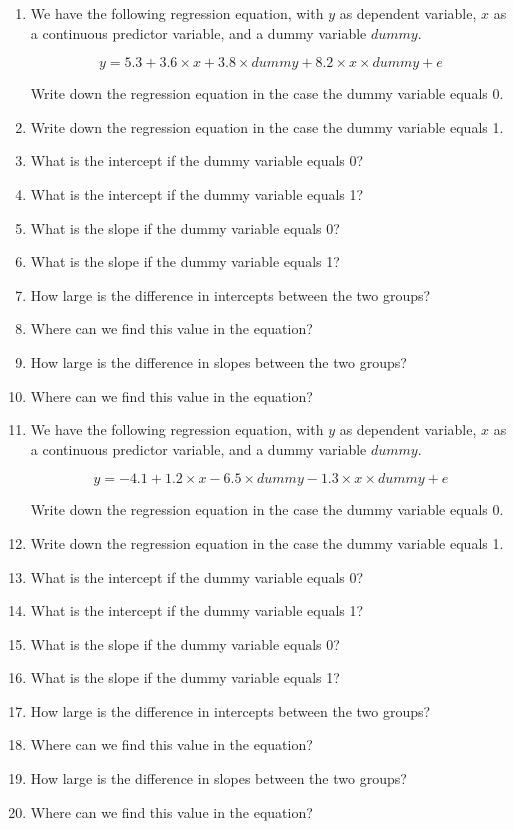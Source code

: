 \begin{enumerate}
\item
We have the following regression equation, with $y$ as dependent variable, $x$ as a continuous predictor variable, and a dummy variable $dummy$.

\begin{equation} 
y = 5.3 + 3.6  \times x + 3.8  \times dummy + 8.2  \times x  \times dummy + e \nonumber
\end{equation}

Write down the regression equation in the case the dummy variable equals 0.
\item Write down the regression equation in the case the dummy variable equals 1.
\item What is the intercept if the dummy variable equals 0?
\item What is the intercept if the dummy variable equals 1?
\item What is the slope if the dummy variable equals 0?
\item What is the slope if the dummy variable equals 1?
\item How large is the difference in intercepts between the two groups?
\item Where can we find this value in the equation?
\item How large is the difference in slopes between the two groups?
\item Where can we find this value in the equation?


\item We have the following regression equation, with $y$ as dependent variable, $x$ as a continuous predictor variable, and a dummy variable $dummy$.

\begin{equation} 
y = - 4.1 + 1.2  \times x - 6.5  \times dummy - 1.3 \times x \times dummy + e \nonumber
\end{equation}

Write down the regression equation in the case the dummy variable equals 0.
\item Write down the regression equation in the case the dummy variable equals 1.
\item What is the intercept if the dummy variable equals 0?
\item What is the intercept if the dummy variable equals 1?
\item What is the slope if the dummy variable equals 0?
\item What is the slope if the dummy variable equals 1?
\item How large is the difference in intercepts between the two groups? 
\item Where can we find this value in the equation?
\item How large is the difference in slopes between the two groups?\
\item Where can we find this value in the equation?


\end{enumerate}
